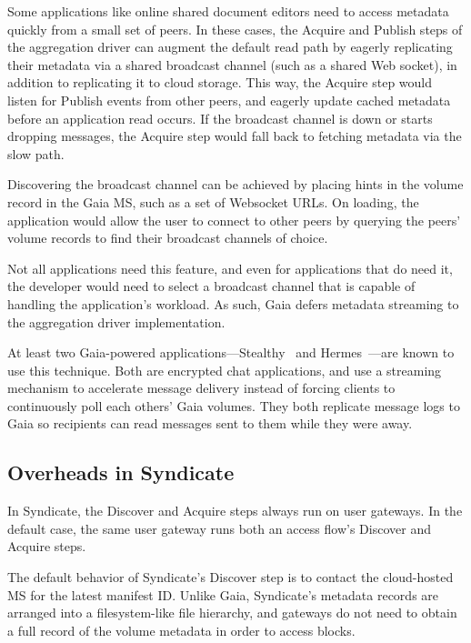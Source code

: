 \hfill \break
{}
\hfill \break

Some applications like online shared document editors need to access metadata quickly
from a small set of peers.  In these cases, the Acquire and Publish steps of the
aggregation driver can augment the default read path by eagerly replicating
their metadata via a shared broadcast channel (such as a shared Web socket), in
addition to replicating it to cloud storage.
This way, the Acquire step would listen for Publish events from other peers, and
eagerly update cached metadata before an application read occurs.  If the
broadcast channel is down or starts dropping messages, the Acquire step would fall back
to fetching metadata via the slow path.

Discovering the broadcast channel can be achieved by placing hints in the
volume record in the Gaia MS, such as a set of Websocket URLs.  On loading, the
application would allow the user to connect to other peers by querying the
peers' volume records to find their broadcast channels of choice.

Not all applications need this feature, and even for applications that do need
it, the developer would need to select a broadcast channel that is capable of
handling the application's workload.  As such, Gaia defers
metadata streaming to the aggregation driver implementation.

At least two Gaia-powered applications---Stealthy~\cite{stealthy.im} and
Hermes~\cite{hi-hermes}---are known to use this technique.  Both are
encrypted chat applications, and use a streaming mechanism to accelerate message delivery instead of
forcing clients to continuously poll each others' Gaia volumes.  They
both replicate message logs to Gaia so recipients can read messages
sent to them while they were away.

\subsection{Overheads in Syndicate}

In Syndicate, the Discover and Acquire steps always run on user gateways.
In the default case, the same user gateway runs both
an access flow's Discover and Acquire steps.

The default behavior of Syndicate's Discover step is to contact the
cloud-hosted MS for the latest manifest ID.  Unlike Gaia, Syndicate's
metadata records are arranged into a filesystem-like file hierarchy, and
gateways do not need to obtain a full record of the volume metadata in order to access
blocks.

